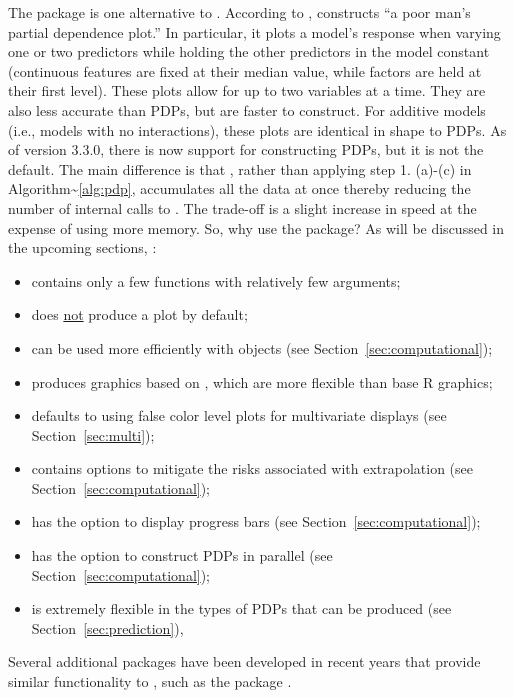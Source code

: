 The  package \citep{plotmo-pkg} is one alternative to
. According to \citeauthor{plotmo-pkg},  constructs
``a poor man's partial dependence plot.'' In particular, it plots a
model's response when varying one or two predictors while holding the
other predictors in the model constant (continuous features are fixed at
their median value, while factors are held at their first level). These
plots allow for up to two variables at a time. They are also less
accurate than PDPs, but are faster to construct. For additive models
(i.e., models with no interactions), these plots are identical in shape
to PDPs. As of  version 3.3.0, there is now support for
constructing PDPs, but it is not the default. The main difference is
that , rather than applying step 1. (a)-(c) in
Algorithm\textasciitilde{}\ref{alg:pdp}, accumulates all the data at
once thereby reducing the number of internal calls to .
The trade-off is a slight increase in speed at the expense of using more
memory. So, why use the  package? As will be discussed in the
upcoming sections, :

\begin{itemize}
  \item contains only a few functions with relatively few arguments;
  \item does \underline{not} produce a plot by default;
  \item can be used more efficiently with  objects (see Section~\ref{sec:computational});
  \item produces graphics based on  \citep{lattice-pkg}, which are more flexible than base R graphics;
  \item defaults to using false color level plots for multivariate displays (see Section~\ref{sec:multi});
  \item contains options to mitigate the risks associated with extrapolation (see Section~\ref{sec:computational});
  \item has the option to display progress bars (see Section~\ref{sec:computational});
  \item has the option to construct PDPs in parallel (see Section~\ref{sec:computational});
    \item is extremely flexible in the types of PDPs that can be produced (see Section~\ref{sec:prediction}),
\end{itemize}

Several additional packages have been developed in recent years that
provide similar functionality to , such as the 
package \citep{iml-pkg}.

